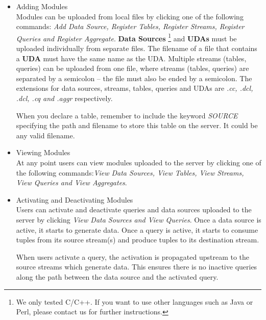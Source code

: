 \documentclass[10pt]{article}
\begin{document}
\begin{itemize}
\item Adding Modules\\
Modules can be uploaded from local files by clicking one of the following commands: {\em Add Data Source, Register Tables, Register Streams, Register Queries and Register Aggregate}.  {\bf Data Sources} \footnote{We only tested C/C++.  If you want to use other languages such as Java or Perl, please contact us for further instructions.} and {\bf UDAs} must be uploaded individually from separate files.  The filename of a file that contains a {\bf UDA} must have the same name as the UDA.  Multiple streams (tables, queries) can be uploaded from one file, where streams (tables, queries) are separated by a semicolon -- the file must also be ended by a semicolon. The extensions for data sources, streams, tables, queries and UDAs are {\em .cc, .dcl, .dcl, .cq and .aggr} respectively. 

When you declare a table, remember to include the keyword {\em SOURCE} specifying the path and filename to store this table on the server.\cite{atlas}  It could be any valid filename.

\item Viewing Modules\\
At any point users can view modules uploaded to the server by clicking one of the following commands:{\em View Data Sources, View Tables, View Streams, View Queries and View Aggregates}.

\item Activating and Deactivating Modules\\
Users can activate and deactivate queries and data sources uploaded to the server by clicking {\em View Data Sources and \em View Queries}.  Once a data source is active, it starts to generate data.  Once a query is active, it starts to consume tuples from its source stream(s) and produce tuples to its destination stream.

When users activate a query, the activation is propagated upstream to the source streams which generate data.  This ensures there is no inactive queries along the path between the data source and the activated query.

\end{itemize}
\end{document}
